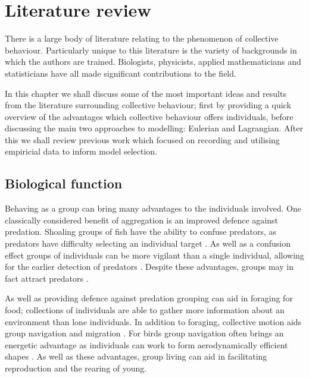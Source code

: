 \graphicspath{{fig/lit_review/}}

\chapter{Literature review}
\label{cha:lit_review}

There is a large body of literature relating to the phenomenon of collective behaviour. Particularly unique to this literature is the variety of backgrounds in which the authors are trained. Biologists, physicists, applied mathematicians and statisticians have all made significant contributions to the field.

In this chapter we shall discuss some of the most important ideas and results from the literature surrounding collective behaviour; first by providing a quick overview of the advantages which collective behaviour offers individuals, before discussing the main two approaches to modelling: Eulerian and Lagrangian. After this we shall review previous work which focused on recording and utilising empiricial data to inform model selection.

\section{Biological function}
\label{sec:biological_function}

Behaving as a group can bring many advantages to the individuals involved. One classically considered  benefit of aggregation is an improved defence against predation. Shoaling groups of fish have the ability to confuse predators, as predators have difficulty selecting an individual target \citep{landeau86}. As well as a confusion effect groups of individuals can be more vigilant than a single individual, allowing for the earlier detection of predators \citep{pitcher93}. Despite these advantages, groups may in fact attract predators \citep{wittenberger85}.

As well as providing defence against predation grouping can aid in foraging for food; collections of individuals are able to gather more information about an environment than lone individuals. In addition to foraging, collective motion aids group navigation and migration \citep{simmons04}. For birds group navigation often brings an energetic advantage as individuals can work to form aerodynamically efficient shapes \citep{weimerskirch01}. As well as these advantages, group living can aid in facilitating reproduction and the rearing of young.

